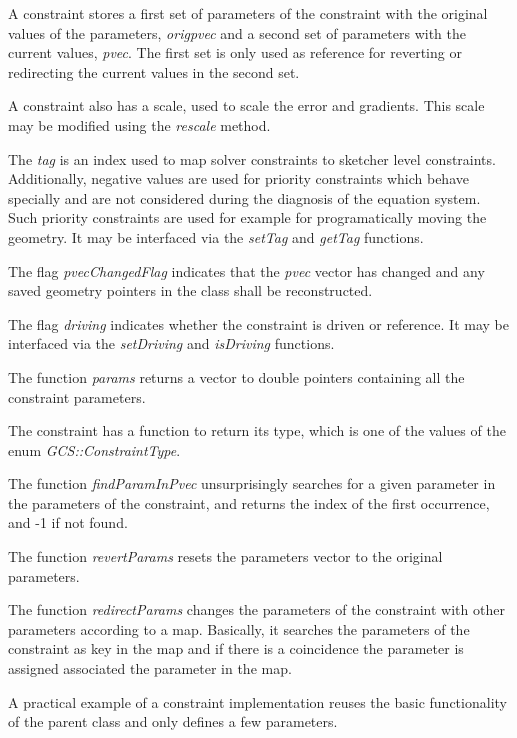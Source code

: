 \documentclass[12pt,twoside,a4paper]{book}
\begin{document}
    A constraint stores a first set of parameters of the constraint with the original values of the parameters, \emph{origpvec} and a second set of parameters with the current values, \emph{pvec}. The first set is only used as reference for reverting or redirecting the current values in the second set.

    A constraint also has a scale, used to scale the error and gradients. This scale may be modified using the \emph{rescale} method.

    The \emph{tag} is an index used to map solver constraints to sketcher level constraints. Additionally, negative values are used for priority constraints which behave specially and are not considered during the diagnosis of the equation system. Such priority constraints are used for example for programatically moving the geometry. It may be interfaced via the \emph{setTag} and \emph{getTag} functions.

    The flag \emph{pvecChangedFlag} indicates that the \emph{pvec} vector has changed and any saved geometry pointers in the class shall be reconstructed.

    The flag \emph{driving} indicates whether the constraint is driven or reference. It may be interfaced via the \emph{setDriving} and \emph{isDriving} functions.

    The function \emph{params} returns a vector to double pointers containing all the constraint parameters.

    The constraint has a function to return its type, which is one of the values of the enum \emph{GCS::ConstraintType}.

    The function \emph{findParamInPvec} unsurprisingly searches for a given parameter in the parameters of the constraint, and returns the index of the first occurrence, and -1 if not found.

    The function \emph{revertParams} resets the parameters vector to the original parameters.

    The function \emph{redirectParams} changes the parameters of the constraint with other parameters according to a map. Basically, it searches the parameters of the constraint as key in the map and if there is a coincidence the parameter is assigned associated the parameter in the map.

    A practical example of a constraint implementation reuses the basic functionality of the parent class and only defines a few parameters.
\end{document}

